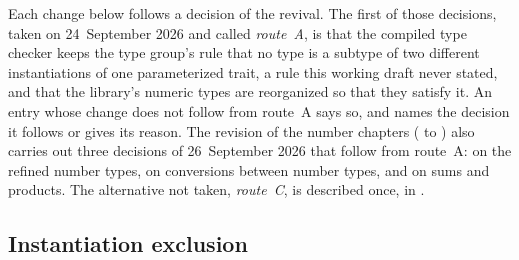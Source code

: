 Each change below follows a decision of the revival.
The first of those decisions, taken on
24~September 2026 and called \emph{route~A}, is that the compiled type checker keeps
the type group's rule that no type is a subtype of two different
instantiations of one parameterized trait, a rule this working draft never
stated, and that the library's numeric types are reorganized so that they
satisfy it.
An entry whose change does not follow from route~A says so, and names the
decision it follows or gives its reason.
The revision of the number chapters ( to
) also carries out three decisions of
26~September 2026 that follow from route~A: on the refined number types, on
conversions between number types, and on sums and products.
The alternative not taken, \emph{route~C}, is described once, in
.

\subsection{Instantiation exclusion}

